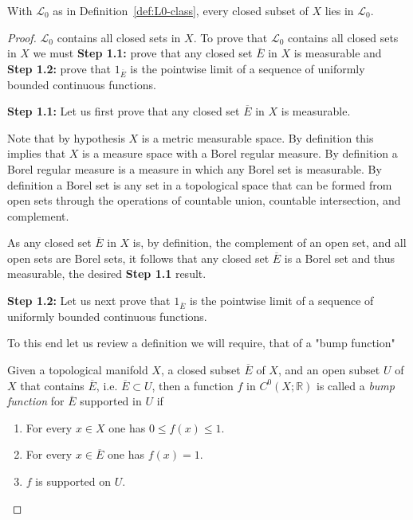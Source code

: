 \begin{proposition}
    \label{prpstn:L0-contains-closed}
    \leanok
    With $\mathcal{L}_0$ as in Definition~\ref{def:L0-class}, every closed subset of $X$ lies in $\mathcal{L}_0$.
\end{proposition}
\begin{proof}
    \leanok
$\mathcal{L}_0$ contains all closed sets in $X$. To prove that $\mathcal{L}_0$ contains all closed sets in $X$ we must \textbf{Step 1.1:} prove that any closed set $\overline{E}$ in $X$ is measurable and \textbf{Step 1.2:} prove that $1_{\overline{E}}$ is the pointwise limit of a sequence of uniformly bounded continuous functions.

\textbf{Step 1.1:} Let us first prove that any closed set $\overline{E}$ in $X$ is measurable.

Note that by hypothesis $X$ is a metric measurable space. By definition this implies that $X$ is a measure space with a Borel regular measure. By definition a Borel regular measure is a measure in which any Borel set is measurable. By definition a Borel set is any set in a topological space that can be formed from open sets through the operations of countable union, countable intersection, and complement.

As any closed set $\overline{E}$ in $X$ is, by definition, the complement of an open set, and all open sets are Borel sets, it follows that any closed set $\overline{E}$ is a Borel set and thus measurable, the desired \textbf{Step 1.1} result.

\textbf{Step 1.2:} Let us next prove that $1_{\overline{E}}$ is the pointwise limit of a sequence of uniformly bounded continuous functions.

To this end let us review a definition we will require, that of a "bump function"

\begin{definition}
    \label{def:bump-function}
    \leanok
    Given a topological manifold $X$, a closed subset $\overline{E}$ of $X$, and an open subset $U$ of $X$ that contains $\overline{E}$, i.e. $\overline{E} \subset U$, then a function $f$ in $C^0(X; \mathbb{R})$ is called a \textit{bump function} for $\overline{E}$ supported in $U$ if
    \begin{enumerate}
        \item For every $x \in X$ one has $0 \le f(x) \le 1$.
        \item For every $x \in \overline{E}$ one has $f(x) = 1$.
        \item $f$ is supported on $U$.
    \end{enumerate}
\end{definition}


\end{proof}
